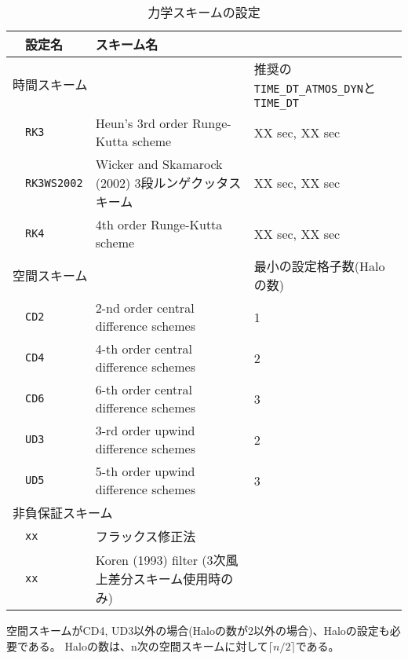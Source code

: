 \begin{table}[h]
\begin{center}
  \caption{力学スキームの設定}
  \label{tab:nml_atm_dyn}
  \begin{tabularx}{150mm}{llXX} \hline
    \rowcolor[gray]{0.9} & \multicolumn{1}{l}{設定名} & \multicolumn{1}{l}{スキーム名} & \\ \hline
    \multicolumn{3}{l}{時間スキーム} & 推奨の\verb|TIME_DT_ATMOS_DYN|と\verb|TIME_DT| \\ \hline
    & \multicolumn{1}{l}{\verb|RK3|} & \multicolumn{1}{l}{Heun's 3rd order Runge-Kutta scheme} & \multicolumn{1}{l}{XX sec, XX sec}\\
    & \multicolumn{1}{l}{\verb|RK3WS2002|} & \multicolumn{1}{X}{Wicker and Skamarock (2002) 3段ルンゲクッタスキーム} & \multicolumn{1}{l}{XX sec, XX sec}\\
    & \multicolumn{1}{l}{\verb|RK4|} & \multicolumn{1}{l}{4th order Runge-Kutta scheme} & \multicolumn{1}{l}{XX sec, XX sec}\\
    \hline
    \multicolumn{3}{l}{空間スキーム} & 最小の設定格子数(Haloの数)\\ \hline
    & \multicolumn{1}{l}{\verb|CD2|} & \multicolumn{1}{l}{2-nd order central difference schemes} & \multicolumn{1}{l}{1}\\
    & \multicolumn{1}{l}{\verb|CD4|} & \multicolumn{1}{l}{4-th order central difference schemes} & \multicolumn{1}{l}{2}\\
    & \multicolumn{1}{l}{\verb|CD6|} & \multicolumn{1}{l}{6-th order central difference schemes} & \multicolumn{1}{l}{3}\\
    & \multicolumn{1}{l}{\verb|UD3|} & \multicolumn{1}{l}{3-rd order upwind difference schemes} & \multicolumn{1}{l}{2}\\
    & \multicolumn{1}{l}{\verb|UD5|} & \multicolumn{1}{l}{5-th order upwind difference schemes} & \multicolumn{1}{l}{3}\\
    \hline
    \multicolumn{4}{l}{非負保証スキーム}\\ \hline
    & \multicolumn{1}{l}{\verb|xx|} & \multicolumn{1}{l}{フラックス修正法} &  \\
    & \multicolumn{1}{l}{\verb|xx|} & \multicolumn{1}{X}{Koren (1993) filter (3次風上差分スキーム使用時のみ)} & \\
\hline
  \end{tabularx}
\end{center}
\end{table}

空間スキームがCD4, UD3以外の場合(Haloの数が2以外の場合)、Haloの設定も必要である。
Haloの数は、n次の空間スキームに対して$\lceil n/2 \rceil$である。\\

\\


